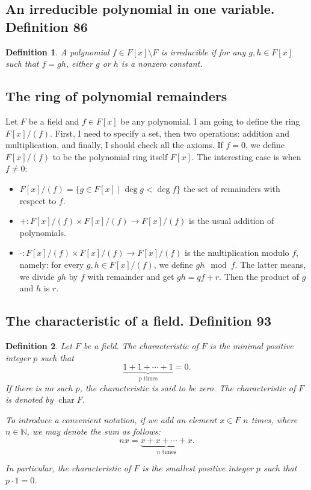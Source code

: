 \documentclass{article}
\newtheorem*{customdefinition}{Definition}
\begin{document}
\subsection*{An irreducible polynomial in one variable. Definition 86}
\begin{customdefinition}
A polynomial \( f \in F[x] \setminus F \) is irreducible if for any \( g, h \in F[x] \) such that \( f = gh \), either \( g \) or \( h \) is a nonzero constant.
\end{customdefinition}

\subsection*{The ring of polynomial remainders}
Let \( F \) be a field and \( f \in F[x] \) be any polynomial. I am going to define the ring \( F[x]/(f) \). First, I need to specify a set, then two operations: addition and multiplication, and finally, I should check all the axioms. If \( f = 0 \), we define \( F[x]/(f) \) to be the polynomial ring itself \( F[x] \). The interesting case is when \( f \neq 0 \):
\begin{itemize}
    \item \( F[x]/(f) = \{g \in F[x] \mid \deg g < \deg f \} \) the set of remainders with respect to \( f \).
    \item \( +: F[x]/(f) \times F[x]/(f) \rightarrow F[x]/(f) \) is the usual addition of polynomials.
    \item \( \cdot : F[x]/(f) \times F[x]/(f) \rightarrow F[x]/(f) \) is the multiplication modulo \( f \), namely: for every \( g, h \in F[x]/(f) \), we define \( gh \mod f \). The latter means, we divide \( gh \) by \( f \) with remainder and get \( gh = qf + r \). Then the product of \( g \) and \( h \) is \( r \).
\end{itemize}

\subsection*{The characteristic of a field. Definition 93}
\begin{customdefinition}
Let \( F \) be a field. The characteristic of \( F \) is the minimal positive integer \( p \) such that
\[
\underbrace{1 + 1 + \cdots + 1}_{p \text{ times}} = 0.
\]
If there is no such \( p \), the characteristic is said to be zero. The characteristic of \( F \) is denoted by \( \operatorname{char} F \).

To introduce a convenient notation, if we add an element \( x \in F \) \( n \) times, where \( n \in \mathbb{N} \), we may denote the sum as follows:
\[
nx = \underbrace{x + x + \cdots + x}_{n \text{ times}}.
\]

In particular, the characteristic of \( F \) is the smallest positive integer \( p \) such that \( p \cdot 1 = 0 \).
\end{customdefinition}
\end{document}
